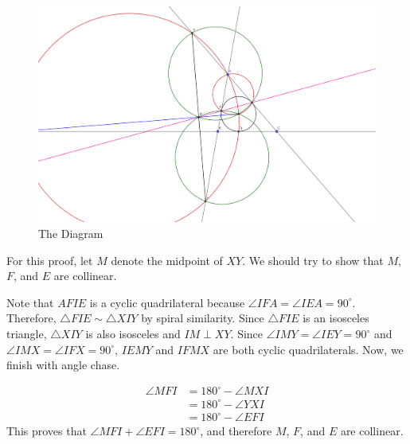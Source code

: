 \documentclass[10pt]{../usamts}
\begin{document}
\begin{solution}
\begin{figure}
\includegraphics[width=16cm]{round2/p4diagram.png}
\caption{The Diagram}
\end{figure}

For this proof, let $M$ denote the midpoint of $XY$. We should try to show that $M$, $F$, and $E$ are collinear.

Note that $AFIE$ is a cyclic quadrilateral because $\angle IFA = \angle IEA = 90^\circ$. Therefore, $\triangle FIE \sim \triangle XIY$ by spiral similarity. Since $\triangle FIE$ is an isosceles triangle, $\triangle XIY$ is also isosceles and $IM \perp XY$. Since $\angle IMY = \angle IEY = 90^\circ$ and $\angle IMX = \angle IFX = 90^\circ$, $IEMY$ and $IFMX$ are both cyclic quadrilaterals. Now, we finish with angle chase.

\begin{align*}
    \angle MFI &= 180^\circ - \angle MXI \tag{$IFMX$ is a cyclic quadrilateral} \\
    &= 180^\circ - \angle YXI \tag{$Y$, $M$, and $X$ are collinear in that order since $M$ is the midpoint of $XY$}\\
    &= 180^\circ - \angle EFI \tag{$\triangle FIE \sim \triangle XIY$ by spiral similarity}
\end{align*}
This proves that $\angle MFI + \angle EFI = 180^\circ$, and therefore $M$, $F$, and $E$ are collinear. \hfill \qedsymbol
\end{solution}
\end{document}
